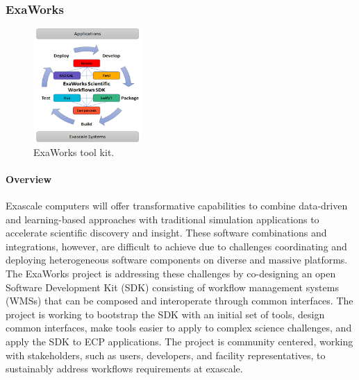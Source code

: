 
\subsubsection{ ExaWorks} \label{subsubsect:exaworks}


\begin{figure}
\vspace{-0.25in}
\begin{center}
    \includegraphics[width=0.37\textwidth]{projects/2.3.5-Ecosystem/2.3.5.10-ExaWorks/exaworks-circle.png}
  \end{center}
  \vspace{-0.2in}
    \caption{ExaWorks tool kit.\label{fig:arch}}
\end{figure} 

\paragraph{Overview} 
Exascale computers will offer transformative capabilities to combine
data-driven and learning-based approaches with traditional simulation
applications to accelerate scientific discovery and insight. These software
combinations and integrations, however, are difficult to achieve due to
challenges coordinating and deploying heterogeneous software components
on diverse and massive platforms. The ExaWorks project is addressing 
these challenges by co-designing an open Software Development Kit (SDK) 
consisting of workflow management systems (WMSs) that can be
composed and interoperate through common interfaces. 
The project is working to bootstrap the SDK with an initial
set of tools, design common interfaces, make tools
easier to apply to complex science challenges, 
and apply the SDK to ECP applications.
The project is community centered, 
working with stakeholders, such as
users, developers, and facility representatives, to 
sustainably address workflows requirements at
exascale.




